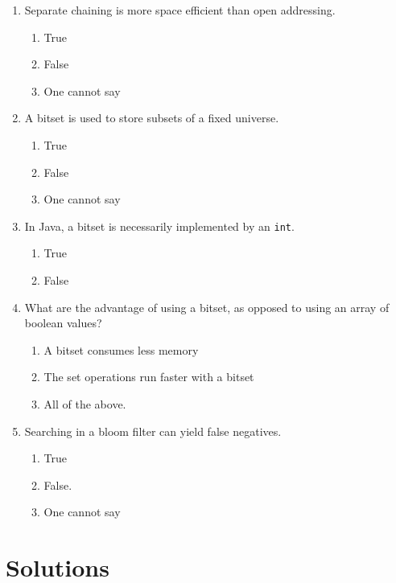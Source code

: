 \documentclass[11pt]{article}
\begin{document}
\begin{enumerate}
\item Separate chaining is more space efficient than open addressing.
\begin{enumerate}
\item True
\item False
\item One cannot say
\end{enumerate}

\item A bitset is used to store subsets of a fixed universe.
\begin{enumerate}
\item True
\item False
\item One cannot say
\end{enumerate}

\item In Java, a bitset is necessarily implemented by an \texttt{int}.
\begin{enumerate}
\item True
\item False
\end{enumerate}

\item What are the advantage of using a bitset, as opposed to using an
array of boolean values?
\begin{enumerate}
\item A bitset consumes less memory
\item The set operations run faster with a bitset
\item All of the above.
\end{enumerate}

\item Searching in a bloom filter can yield false negatives.
\begin{enumerate}
\item True
\item False.
\item One cannot say
\end{enumerate}
\end{enumerate}


\section{Solutions}
\label{sec:orgf3da5c9}
\end{document}
